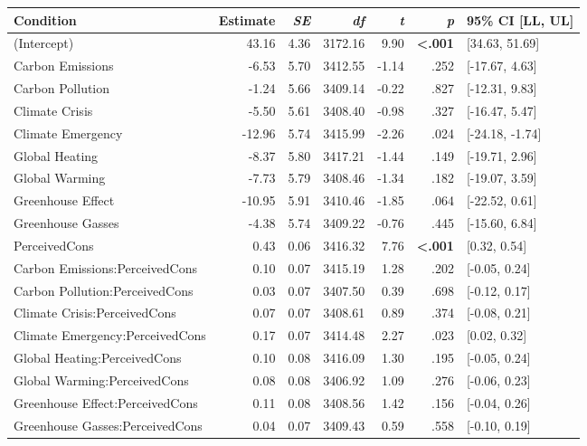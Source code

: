 \begin{table}[ht]
\centering
\begin{tabular}{lrrrrrl}
  \hline
Condition & Estimate & \textit{SE} & \textit{df} & \textit{t} & \textit{p} & 95\% CI [LL, UL] \\ 
  \hline
(Intercept) & 43.16 & 4.36 & 3172.16 & 9.90 & \textbf{\textless  .001} & [34.63, 51.69] \\ 
  Carbon Emissions & -6.53 & 5.70 & 3412.55 & -1.14 & .252 & [-17.67, 4.63] \\ 
  Carbon Pollution & -1.24 & 5.66 & 3409.14 & -0.22 & .827 & [-12.31, 9.83] \\ 
  Climate Crisis & -5.50 & 5.61 & 3408.40 & -0.98 & .327 & [-16.47, 5.47] \\ 
  Climate Emergency & -12.96 & 5.74 & 3415.99 & -2.26 & .024 & [-24.18, -1.74] \\ 
  Global Heating & -8.37 & 5.80 & 3417.21 & -1.44 & .149 & [-19.71, 2.96] \\ 
  Global Warming & -7.73 & 5.79 & 3408.46 & -1.34 & .182 & [-19.07, 3.59] \\ 
  Greenhouse Effect & -10.95 & 5.91 & 3410.46 & -1.85 & .064 & [-22.52, 0.61] \\ 
  Greenhouse Gasses & -4.38 & 5.74 & 3409.22 & -0.76 & .445 & [-15.60, 6.84] \\ 
  PerceivedCons & 0.43 & 0.06 & 3416.32 & 7.76 & \textbf{\textless  .001} & [0.32, 0.54] \\ 
  Carbon Emissions:PerceivedCons & 0.10 & 0.07 & 3415.19 & 1.28 & .202 & [-0.05, 0.24] \\ 
  Carbon Pollution:PerceivedCons & 0.03 & 0.07 & 3407.50 & 0.39 & .698 & [-0.12, 0.17] \\ 
  Climate Crisis:PerceivedCons & 0.07 & 0.07 & 3408.61 & 0.89 & .374 & [-0.08, 0.21] \\ 
  Climate Emergency:PerceivedCons & 0.17 & 0.07 & 3414.48 & 2.27 & .023 & [0.02, 0.32] \\ 
  Global Heating:PerceivedCons & 0.10 & 0.08 & 3416.09 & 1.30 & .195 & [-0.05, 0.24] \\ 
  Global Warming:PerceivedCons & 0.08 & 0.08 & 3406.92 & 1.09 & .276 & [-0.06, 0.23] \\ 
  Greenhouse Effect:PerceivedCons & 0.11 & 0.08 & 3408.56 & 1.42 & .156 & [-0.04, 0.26] \\ 
  Greenhouse Gasses:PerceivedCons & 0.04 & 0.07 & 3409.43 & 0.59 & .558 & [-0.10, 0.19] \\ 
   \hline
\end{tabular}
\end{table}
